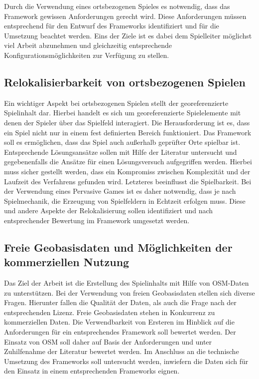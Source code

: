 Durch die Verwendung eines ortsbezogenen Spieles es notwendig, dass das Framework gewissen Anforderungen gerecht wird. Diese Anforderungen müssen entsprechend für den Entwurf des Frameworks identifiziert und für die Umsetzung beachtet werden. Eins der Ziele ist es dabei dem Spielleiter möglichst viel Arbeit abzunehmen und gleichzeitig entsprechende Konfigurationsmöglichkeiten zur Verfügung zu stellen.

\subsection*{Relokalisierbarkeit von ortsbezogenen Spielen}

Ein wichtiger Aspekt bei ortsbezogenen Spielen stellt der georeferenzierte Spielinhalt dar. Hierbei handelt es sich um georeferenzierte Spielelemente mit denen der Spieler über das Spielfeld interagiert. Die Herausforderung ist es, dass ein Spiel nicht nur in einem fest definierten Bereich funktioniert. Das Framework soll es ermöglichen, dass das Spiel auch außerhalb geprüfter Orte spielbar ist. Entsprechende Lösungsansätze sollen mit Hilfe der Literatur untersucht und gegebenenfalls die Ansätze für einen Lösungsversuch aufgegriffen werden. Hierbei muss sicher gestellt werden, dass ein Kompromiss zwischen Komplexität und der Laufzeit des Verfahrens gefunden wird. Letzteres beeinflusst die Spielbarkeit. Bei der Verwendung eines Pervasive Games ist es daher notwendig, dass je nach Spielmechanik, die Erzeugung von Spielfeldern in Echtzeit erfolgen muss. Diese und andere Aspekte der Relokalisierung sollen identifiziert und nach entsprechender Bewertung im Framework umgesetzt werden.

\subsection*{Freie Geobasisdaten und Möglichkeiten der kommerziellen Nutzung}

Das Ziel der Arbeit ist die Erstellung des Spielinhalts mit Hilfe von OSM-Daten zu unterstützen.
Bei der Verwendung von freien Geobasisdaten stellen sich diverse Fragen. Hierunter fallen die Qualität der Daten, als auch die Frage nach der entsprechenden Lizenz. Freie Geobasisdaten stehen in Konkurrenz zu kommerziellen Daten. Die Verwendbarkeit von Ersteren im Hinblick auf die Anforderungen für ein entsprechendes Framework soll bewertet werden.
Der Einsatz von OSM soll daher auf Basis der Anforderungen und unter Zuhilfenahme der Literatur bewertet werden. Im Anschluss an die technische Umsetzung des Frameworks soll untersucht werden, inwiefern die Daten sich für den Einsatz in einem entsprechenden Frameworks eignen.

